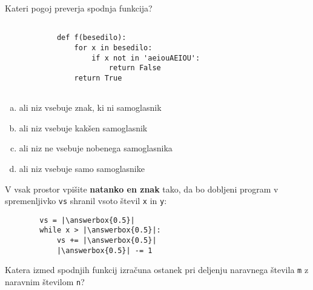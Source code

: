 \documentclass[arhiv, 10pt]{../izpit}
\newcommand{\inlinepy}[1]{\texttt{#1}}
\newcommand{\answerbox}[1]{\framebox{\vphantom{\large M}\hspace{#1cm}}}
\begin{document}
        \naloga*

        \begin{multicols}{2}
        \noindent
        Kateri pogoj preverja spodnja funkcija?
        \begin{verbatim}
        
            def f(besedilo):
                for x in besedilo:
                    if x not in 'aeiouAEIOU':
                        return False
                return True
            
        \end{verbatim}

        \begin{enumerate}[(a)]
\item ali niz vsebuje znak, ki ni samoglasnik
\item ali niz vsebuje kakšen samoglasnik
\item ali niz ne vsebuje nobenega samoglasnika
\item ali niz vsebuje samo samoglasnike
\end{enumerate}

        \end{multicols}
    
        \naloga*
        \begin{multicols}{2}
        \noindent
        V vsak prostor vpišite \textbf{natanko en znak} tako, da bo dobljeni program v spremenljivko \inlinepy{vs} shranil vsoto števil \inlinepy{x} in \inlinepy{y}:
        
        \columnbreak
        \begin{verbatim}
        vs = |\answerbox{0.5}|
        while x > |\answerbox{0.5}|:
            vs += |\answerbox{0.5}|
            |\answerbox{0.5}| -= 1
        \end{verbatim}
        \end{multicols}
    
        \clearpage
        \naloga
        
        Katera izmed spodnjih funkcij izračuna ostanek pri deljenju naravnega števila \inlinepy{m} z naravnim številom \inlinepy{n}?
    
\end{document}
